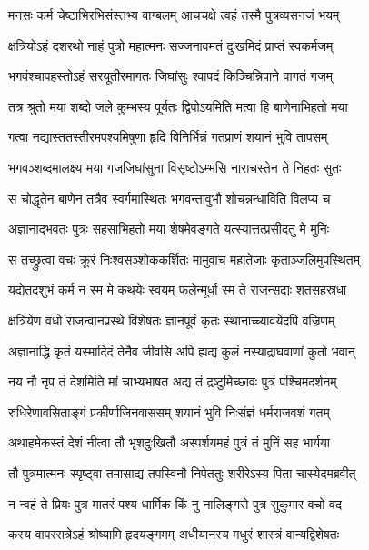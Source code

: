 \twolineshloka
{मनसः कर्म चेष्टाभिरभिसंस्तभ्य वाग्बलम्}
{आचचक्षे त्वहं तस्मै पुत्रव्यसनजं भयम्} %

\twolineshloka
{क्षत्रियोऽहं दशरथो नाहं पुत्रो महात्मनः}
{सज्जनावमतं दुःखमिदं प्राप्तं स्वकर्मजम्} %

\twolineshloka
{भगवंश्चापहस्तोऽहं सरयूतीरमागतः}
{जिघांसुः श्वापदं किञ्चिन्निपाने वागतं गजम्} %

\twolineshloka
{तत्र श्रुतो मया शब्दो जले कुम्भस्य पूर्यतः}
{द्विपोऽयमिति मत्वा हि बाणेनाभिहतो मया} %

\twolineshloka
{गत्वा नद्यास्ततस्तीरमपश्यमिषुणा हृदि}
{विनिर्भिन्नं गतप्राणं शयानं भुवि तापसम्} %

\twolineshloka
{भगवञ्शब्दमालक्ष्य मया गजजिघांसुना}
{विसृष्टोऽम्भसि नाराचस्तेन ते निहतः सुतः} %

\twolineshloka
{स चोद्धृतेन बाणेन तत्रैव स्वर्गमास्थितः}
{भगवन्तावुभौ शोचन्नन्धाविति विलप्य च} %

\twolineshloka
{अज्ञानाद्भवतः पुत्रः सहसाभिहतो मया}
{शेषमेवङ्गते यत्स्यात्तत्प्रसीदतु मे मुनिः} %

\twolineshloka
{स तच्छ्रुत्वा वचः क्रूरं निःश्वसञ्शोककर्शितः}
{मामुवाच महातेजाः कृताञ्जलिमुपस्थितम्} %

\twolineshloka
{यद्येतदशुभं कर्म न स्म मे कथयेः स्वयम्}
{फलेन्मूर्धा स्म ते राजन्सद्यः शतसहस्रधा} %

\twolineshloka
{क्षत्रियेण वधो राजन्वानप्रस्थे विशेषतः}
{ज्ञानपूर्वं कृतः स्थानाच्च्यावयेदपि वज्रिणम्} %

\twolineshloka
{अज्ञानाद्धि कृतं यस्मादिदं तेनैव जीवसि}
{अपि ह्यद्य कुलं नस्याद्राघवाणां कुतो भवान्} %

\twolineshloka
{नय नौ नृप तं देशमिति मां चाभ्यभाषत}
{अद्य तं द्रष्टुमिच्छावः पुत्रं पश्चिमदर्शनम्} %

\twolineshloka
{रुधिरेणावसिताङ्गं प्रकीर्णाजिनवाससम्}
{शयानं भुवि निःसंज्ञं धर्मराजवशं गतम्} %

\twolineshloka
{अथाहमेकस्तं देशं नीत्वा तौ भृशदुःखितौ}
{अस्पर्शयमहं पुत्रं तं मुनिं सह भार्यया} %

\twolineshloka
{तौ पुत्रमात्मनः स्पृष्ट्वा तमासाद्य तपस्विनौ}
{निपेततुः शरीरेऽस्य पिता चास्येदमब्रवीत्} %

\twolineshloka
{न न्वहं ते प्रियः पुत्र मातरं पश्य धार्मिक}
{किं नु नालिङ्गसे पुत्र सुकुमार वचो वद} %

\twolineshloka
{कस्य वापररात्रेऽहं श्रोष्यामि हृदयङ्गमम्}
{अधीयानस्य मधुरं शास्त्रं वान्यद्विशेषतः} %

